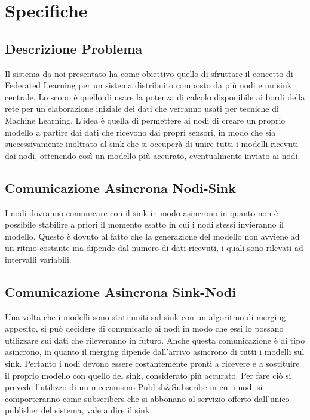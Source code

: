 \chapter{Specifiche}
	\section{Descrizione Problema}
		Il sistema da noi presentato ha come obiettivo quello di sfruttare il concetto di Federated Learning per un sistema distribuito composto da più nodi e un sink centrale. Lo scopo è quello di usare la potenza di calcolo disponibile ai bordi della rete per un’elaborazione iniziale dei dati che verranno usati per tecniche di Machine Learning. L’idea è quella di permettere ai nodi di creare un proprio modello a partire dai dati che ricevono dai propri sensori, in modo che sia successivamente inoltrato al sink che si occuperà di unire tutti i modelli ricevuti dai nodi, ottenendo così un modello più accurato, eventualmente inviato ai nodi.

  \section{Comunicazione Asincrona Nodi-Sink}
    I nodi dovranno comunicare con il sink in modo asincrono in quanto non è possibile stabilire a priori il momento esatto in cui i nodi stessi invieranno il modello. Questo è dovuto al fatto che la generazione del modello non avviene ad un ritmo costante ma dipende dal numero di dati ricevuti, i quali sono rilevati ad intervalli variabili.

  \section{Comunicazione Asincrona Sink-Nodi}
		Una volta che i modelli sono stati uniti sul sink con un algoritmo di merging apposito, si può decidere di comunicarlo ai nodi in modo che essi lo possano utilizzare sui dati che rileveranno in futuro. Anche questa comunicazione è di tipo asincrono, in quanto il merging dipende dall’arrivo asincrono di tutti i modelli sul sink. Pertanto i nodi devono essere costantemente pronti a ricevere e a sostituire il proprio modello con quello del sink, considerato più accurato. Per fare ciò si prevede l’utilizzo di un meccanismo Publish\&Subscribe in cui i nodi si comporteranno come subscribers che si abbonano al servizio offerto dall’unico publisher del sistema, vale a dire il sink.

